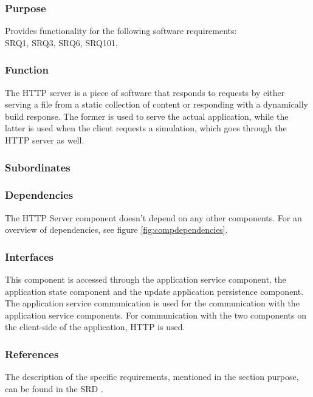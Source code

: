 \subsubsection*{Purpose}
Provides functionality for the following software requirements:\\
SRQ1, SRQ3, SRQ6, SRQ101,

\subsubsection*{Function}
The HTTP server is a piece of software that responds to requests by either serving a file from a static collection of content or responding with a dynamically build response. The former is used to serve the actual application, while the latter is used when the client requests a simulation, which goes through the HTTP server as well.

\subsubsection*{Subordinates}

\subsubsection*{Dependencies}
The HTTP Server component doesn't depend on any other components. For an overview of dependencies, see figure \ref{fig:compdependencies}.

\subsubsection*{Interfaces}
This component is accessed through the application service component, the application state component and the update application persistence component. The application service communication is used for the communication with the application service components. For communication with the two components on the client-side of the application, HTTP is used.

\subsubsection*{References}
The description of the specific requirements, mentioned in the section purpose, can be found in the SRD \cite{srd}.

